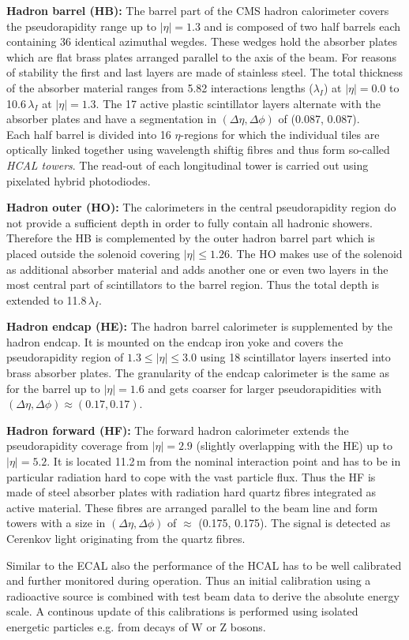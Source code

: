 \begin{description}
 \item \textbf{Hadron barrel (HB):} The barrel part of the CMS hadron calorimeter covers the pseudorapidity range up to $|\eta| = 1.3$ and is composed of two half barrels each containing 36 identical azimuthal wegdes. These wedges hold the absorber plates which are flat brass plates arranged parallel to the axis of the beam. For reasons of stability the first and last layers are made of stainless steel. The total thickness of the absorber material ranges from 5.82 interactions lengths ($\lambda_I$) at $|\eta| = 0.0$ to 10.6\,$\lambda_I$ at $|\eta| = 1.3$. The 17 active plastic scintillator layers alternate with the absorber plates and have a segmentation in $(\Delta \eta, \Delta \phi)$ of (0.087, 0.087).\\
Each half barrel is divided into 16 $\eta$-regions for which the individual tiles are optically linked together using wavelength shiftig fibres and thus form so-called \textit{HCAL towers}. The read-out of each longitudinal tower is carried out using pixelated hybrid photodiodes.
 \item \textbf{Hadron outer (HO):} The calorimeters in the central pseudorapidity region do not provide a sufficient depth in order to fully contain all hadronic showers. Therefore the HB is complemented by the outer hadron barrel part which is placed outside the solenoid covering $|\eta| \le 1.26$. The HO makes use of the solenoid as additional absorber material and adds another one or even two layers in the most central part of scintillators to the barrel region. Thus the total depth is extended to 11.8\,$\lambda_I$.
 \item \textbf{Hadron endcap (HE):} The hadron barrel calorimeter is supplemented by the hadron endcap. It is mounted on the endcap iron yoke and covers the pseudorapidity region of $1.3 \le |\eta| \le 3.0$ using 18 scintillator layers inserted into brass absorber plates. The granularity of the endcap calorimeter is the same as for the barrel up to $|\eta| = 1.6$ and gets coarser for larger pseudorapidities with $(\Delta \eta, \Delta \phi) \approx (0.17, 0.17)$.
 \item \textbf{Hadron forward (HF):} The forward hadron calorimeter extends the pseudorapidity coverage from $|\eta| = 2.9$ (slightly overlapping with the HE) up to $|\eta| = 5.2$. It is located 11.2\,m from the nominal interaction point and has to be in particular radiation hard to cope with the vast particle flux. Thus the HF is made of steel absorber plates with radiation hard quartz fibres integrated as active material. These fibres are arranged parallel to the beam line and form towers with a size in $(\Delta \eta, \Delta \phi)$ of $\approx$ (0.175, 0.175). The signal is detected as Cerenkov light originating from the quartz fibres.
\end{description}
Similar to the ECAL also the performance of the HCAL has to be well calibrated and further monitored during operation. Thus an initial calibration using a radioactive source is combined with test beam data to derive the absolute energy scale. A continous update of this calibrations is performed using isolated energetic particles e.g. from decays of W or Z bosons. 

